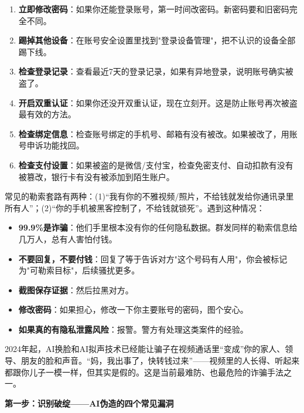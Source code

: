 
\begin{enumerate}
  \item \textbf{立即修改密码}：如果你还能登录账号，第一时间改密码。新密码要和旧密码完全不同。
  \item \textbf{踢掉其他设备}：在账号安全设置里找到"登录设备管理"，把不认识的设备全部踢下线。
  \item \textbf{检查登录记录}：查看最近7天的登录记录，如果有异地登录，说明账号确实被盗了。
  \item \textbf{开启双重认证}：如果你还没开双重认证，现在立刻开。这是防止账号再次被盗最有效的方法。
  \item \textbf{检查绑定信息}：检查账号绑定的手机号、邮箱有没有被改。如果被改了，用账号申诉功能找回。
  \item \textbf{检查支付设置}：如果被盗的是微信/支付宝，检查免密支付、自动扣款有没有被篡改，银行卡有没有被添加到陌生账户。
\end{enumerate}


常见的勒索套路有两种：(1)“我有你的不雅视频/照片，不给钱就发给你通讯录里所有人”；(2)“你的手机被黑客控制了，不给钱就锁死”。遇到这种情况：

\begin{itemize}
  \item \textbf{99.9\%是诈骗}：他们手里根本没有你的任何隐私数据。群发同样的勒索信息给几万人，总有人害怕付钱。
  \item \textbf{不要回复，不要付钱}：回复了等于告诉对方"这个号码有人用"，你会被标记为"可勒索目标"，后续骚扰更多。
  \item \textbf{截图保存证据}：然后拉黑对方。
  \item \textbf{修改密码}：如果担心，修改一下你主要账号的密码，图个安心。
  \item \textbf{如果真的有隐私泄露风险}：报警。警方有处理这类案件的经验。
\end{itemize}


2024年起，AI换脸和AI拟声技术已经能让骗子在视频通话里“变成”你的家人、领导、朋友的脸和声音。“妈，我出事了，快转钱过来”——视频里的人长得、听起来都跟你儿子一模一样，但其实是假的。这是当前最难防、也最危险的诈骗手法之一。

\textbf{第一步：识别破绽——AI伪造的四个常见漏洞}\par

